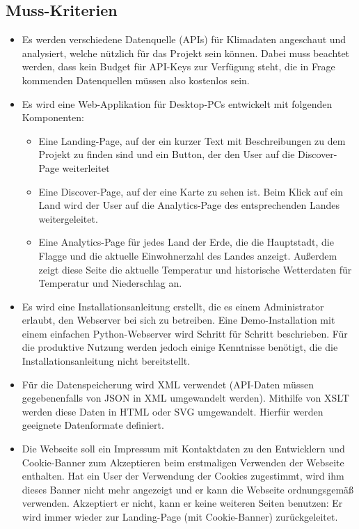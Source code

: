 \documentclass[12pt]{article}
\begin{document}
\subsection*{Muss-Kriterien}
\begin{itemize}
	\item Es werden verschiedene Datenquelle (APIs) für Klimadaten angeschaut und analysiert, welche nützlich für das Projekt sein können. Dabei muss beachtet werden, dass kein Budget für API-Keys zur Verfügung steht, die in Frage kommenden Datenquellen müssen also kostenlos sein.
    \item Es wird eine Web-Applikation für Desktop-PCs entwickelt mit folgenden Komponenten:
    \begin{itemize}
		\item Eine Landing-Page, auf der ein kurzer Text mit Beschreibungen zu dem Projekt zu finden sind und ein Button, der den User auf die Discover-Page weiterleitet
		\item Eine Discover-Page, auf der eine Karte zu sehen ist. Beim Klick auf ein Land wird der User auf die Analytics-Page des entsprechenden Landes weitergeleitet.
		\item Eine Analytics-Page für jedes Land der Erde, die die Hauptstadt, die Flagge und die aktuelle Einwohnerzahl des Landes anzeigt. Außerdem zeigt diese Seite die aktuelle Temperatur und historische Wetterdaten für Temperatur und Niederschlag an.
	\end{itemize}
    \item Es wird eine Installationsanleitung erstellt, die es einem Administrator erlaubt, den Webserver bei sich zu betreiben. Eine Demo-Installation mit einem einfachen Python-Webserver wird Schritt für Schritt beschrieben. Für die produktive Nutzung werden jedoch einige Kenntnisse benötigt, die die Installationsanleitung nicht bereitstellt.
    \item Für die Datenspeicherung wird XML verwendet (API-Daten müssen gegebenenfalls von JSON in XML umgewandelt werden). Mithilfe von XSLT werden diese Daten in HTML oder SVG umgewandelt. Hierfür werden geeignete Datenformate definiert.
    \item Die Webseite soll ein Impressum mit Kontaktdaten zu den Entwicklern und Cookie-Banner zum Akzeptieren beim erstmaligen Verwenden der Webseite enthalten. Hat ein User der Verwendung der Cookies zugestimmt, wird ihm dieses Banner nicht mehr angezeigt und er kann die Webseite ordnungsgemäß verwenden. Akzeptiert er nicht, kann er keine weiteren Seiten benutzen: Er wird immer wieder zur Landing-Page (mit Cookie-Banner) zurückgeleitet.
\end{itemize}
\end{document}
